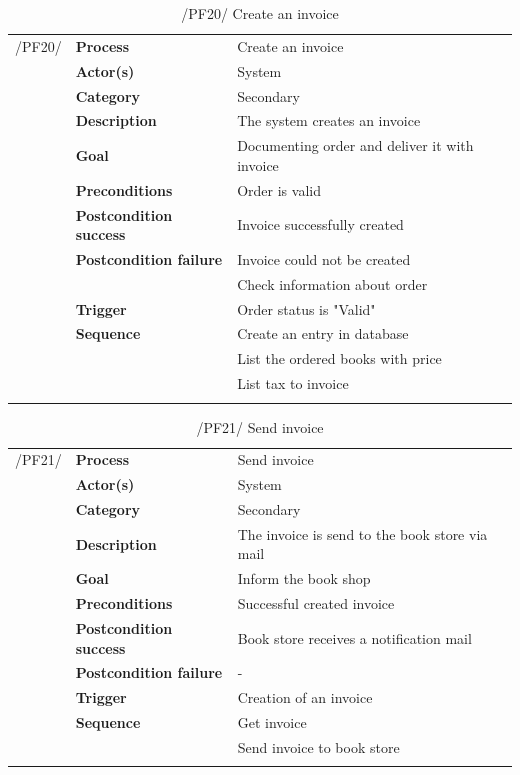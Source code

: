 \documentclass[11pt,a4paper,oneside,svgnames]{report}
\begin{document}
\begin{table}[H]
\centering
\begin{tabular}{p{1.5cm}p{3cm}p{8cm}}
\cellcolor{white}/PF20/	& \textbf{Process} & Create an invoice\\
\cellcolor{white}		& \textbf{Actor(s)} & System\\
\cellcolor{white}		& \textbf{Category} & Secondary\\
\cellcolor{white}		& \textbf{Description}	 & The system creates an invoice \\
\cellcolor{white}		& \textbf{Goal} & Documenting order and deliver it with invoice\\
\cellcolor{white}		& \textbf{Preconditions} & Order is valid\\
\cellcolor{white}		& \textbf{Postcondition success} & Invoice successfully created\\
\cellcolor{white}		& \textbf{Postcondition failure} & Invoice could not be created\\
\cellcolor{white}		& & Check information about order\\
\cellcolor{white}		& \textbf{Trigger} & Order status is "Valid"\\
\cellcolor{white}		& \textbf{Sequence} & Create an entry in database\\
\cellcolor{white}		& & List the ordered books with price\\
\cellcolor{white}		& & List tax to invoice\\
\cellcolor{white}\hfill \\
\end{tabular}
\caption{/PF20/ Create an invoice}
\label{tab:pf20}
\end{table}

\begin{table}[H]
\centering
\begin{tabular}{p{1.5cm}p{3cm}p{8cm}}
\cellcolor{white}/PF21/	& \textbf{Process} & Send invoice\\
\cellcolor{white}		& \textbf{Actor(s)} & System\\
\cellcolor{white}		& \textbf{Category} & Secondary\\
\cellcolor{white}		& \textbf{Description}	 & The invoice is send to the book store via mail\\
\cellcolor{white}		& \textbf{Goal} & Inform the book shop\\
\cellcolor{white}		& \textbf{Preconditions} & Successful created invoice\\
\cellcolor{white}		& \textbf{Postcondition success} & Book store receives a notification mail\\
\cellcolor{white}		& \textbf{Postcondition failure} & -\\
\cellcolor{white}		& \textbf{Trigger} & Creation of an invoice\\
\cellcolor{white}		& \textbf{Sequence} & Get invoice\\
\cellcolor{white}		& & Send invoice to book store\\
\cellcolor{white}\hfill \\
\end{tabular}
\caption{/PF21/ Send invoice}
\label{tab:pf21}
\end{table}
\end{document}
